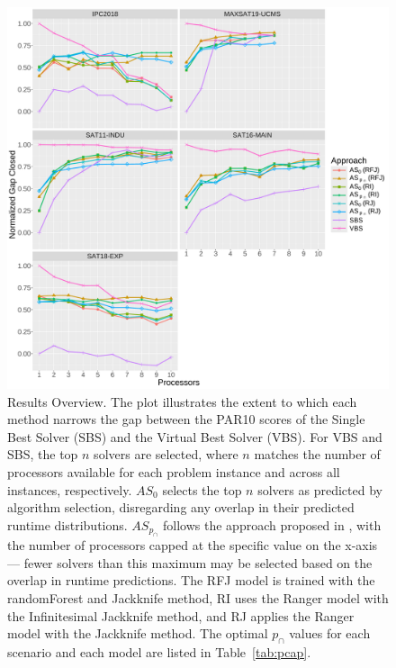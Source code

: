 \begin{figure}[t]
        \includegraphics[width=\linewidth]{plots/learner_comparison_line_chart_parallel_NormalizedGap.pdf}    
    \caption[Results Summary: Comparing Ranger and RandomForest Models in $AS_{p_{\cap}}$ Performance]{
    Results Overview. The plot illustrates the extent to which each method narrows the gap between the PAR10 scores of the Single Best Solver (SBS) and the Virtual Best Solver (VBS). For VBS and SBS, the top $n$ solvers are selected, where $n$ matches the number of processors available for each problem instance and across all instances, respectively. $AS_0$ selects the top $n$ solvers as predicted by algorithm selection, disregarding any overlap in their predicted runtime distributions. $AS_{p_{\cap}}$ follows the approach proposed in \cite{kashgarani2023automatic}, with the number of processors capped at the specific value on the x-axis — fewer solvers than this maximum may be selected based on the overlap in runtime predictions. The RFJ model is trained with the randomForest and Jackknife method, RI uses the Ranger model with the Infinitesimal Jackknife method, and RJ applies the Ranger model with the Jackknife method. The optimal $p_{\cap}$ values for each scenario and each model are listed in Table~\ref{tab:pcap}.
    }
    \label{fig:rangervsrf}
\end{figure}

